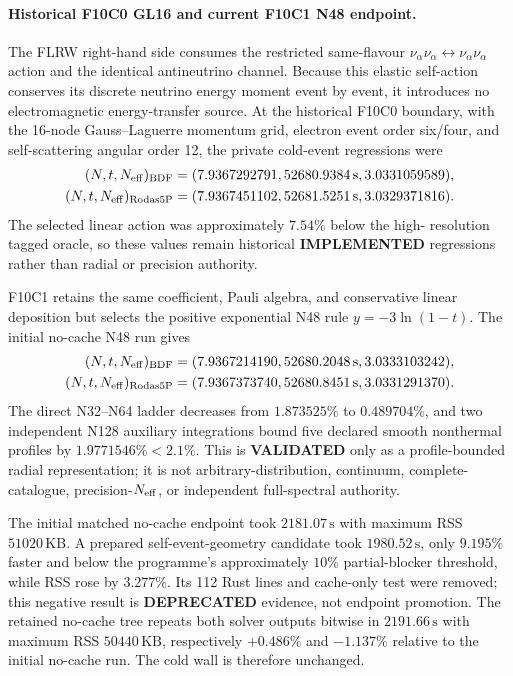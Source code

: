\paragraph{Historical F10C0 GL16 and current F10C1 N48 endpoint.} The FLRW
right-hand side consumes the restricted same-flavour
$\nu_\alpha\nu_\alpha\leftrightarrow\nu_\alpha\nu_\alpha$ action and the
identical antineutrino channel.  Because this elastic self-action conserves
its discrete neutrino energy moment event by event, it introduces no
electromagnetic energy-transfer source.  At the historical F10C0 boundary,
with the 16-node Gauss--Laguerre momentum grid, electron event order six/four,
and self-scattering angular order 12, the private cold-event regressions were
\begin{align*}
(N,t,N_{\rm eff})_{\rm BDF}
  &= (7.9367292791,52680.9384\,\mathrm{s},3.0331059589),\\
(N,t,N_{\rm eff})_{\rm Rodas5P}
  &= (7.9367451102,52681.5251\,\mathrm{s},3.0329371816).
\end{align*}
The selected linear action was approximately $7.54\%$ below the high-
resolution tagged oracle, so these values remain historical
\textbf{IMPLEMENTED} regressions rather than radial or precision authority.

F10C1 retains the same coefficient, Pauli algebra, and conservative linear
deposition but selects the positive exponential N48 rule
$y=-3\ln(1-t)$.  The initial no-cache N48 run gives
\begin{align*}
(N,t,N_{\rm eff})_{\rm BDF}
  &= (7.9367214190,52680.2048\,\mathrm{s},3.0333103242),\\
(N,t,N_{\rm eff})_{\rm Rodas5P}
  &= (7.9367373740,52680.8451\,\mathrm{s},3.0331291370).
\end{align*}
The direct N32--N64 ladder decreases from $1.873525\%$ to $0.489704\%$,
and two independent N128 auxiliary integrations bound five declared smooth
nonthermal profiles by $1.9771546\%<2.1\%$.  This is
\textbf{VALIDATED} only as a profile-bounded radial representation; it is not
arbitrary-distribution, continuum, complete-catalogue, precision-$N_{\rm eff}$, or
independent full-spectral authority.

The initial matched no-cache endpoint took $2181.07\,\mathrm{s}$ with maximum
RSS $51020\,\mathrm{KB}$.  A prepared self-event-geometry candidate took
$1980.52\,\mathrm{s}$, only $9.195\%$ faster and below the programme's
approximately $10\%$ partial-blocker threshold, while RSS rose by $3.277\%$.
Its 112 Rust lines and cache-only test were removed; this negative result is
\textbf{DEPRECATED} evidence, not endpoint promotion.
The retained no-cache tree repeats both solver outputs bitwise in
$2191.66\,\mathrm{s}$ with maximum RSS $50440\,\mathrm{KB}$, respectively
$+0.486\%$ and $-1.137\%$ relative to the initial no-cache run.  The cold
wall is therefore unchanged.

